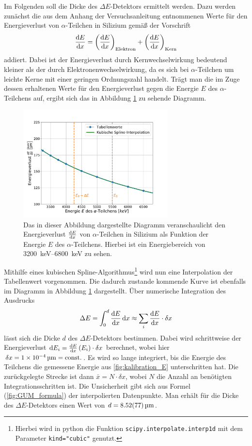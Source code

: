 Im Folgenden soll die Dicke des $\Delta E$-Detektors ermittelt werden.
Dazu werden zunächst die aus dem Anhang der Versuchsanleitung\cite{wwu} entnommenen Werte für den Energieverlust von $\alpha$-Teilchen in Silizium gemäß der Vorschrift
\begin{align}
	\dv{E}{x}= \left( \dv{E}{x}\right)_\text{Elektron} + \left(\dv{E}{x}\right)_\text{Kern}
\end{align}
addiert.
Dabei ist der Energieverlust durch Kernwechselwirkung bedeutend kleiner als der durch Elektronenwechselwirkung, da es sich bei $\alpha$-Teilchen um leichte Kerne mit einer geringen Ordnungszahl handelt.
Trägt man die im Zuge dessen erhaltenen Werte für den Energieverlust gegen die Energie $E$ des $\alpha$-Teilchens auf, ergibt sich das in Abbildung \ref{EnergyLossSpectrum} zu sehende Diagramm.
\begin{figure}[ht]
	\centering
	\includegraphics[width=0.7\textwidth]{src/EnergyLossSpectrum}
	\caption{Das in dieser Abbildung dargestellte Diagramm veranschaulicht den Energieverlust $\dv{E}{x}$ von $\alpha$-Teilchen in Silizium als Funktion der Energie $E$ des $\alpha$-Teilchens. Hierbei ist ein Energiebereich von \SIrange{3200}{6800}{\kilo\electronvolt} zu sehen.}
	\label{EnergyLossSpectrum}
\end{figure}
Mithilfe eines kubischen Spline-Algorithmus\footnote{Hierbei wird in python die Funktion \texttt{scipy.interpolate.interp1d} mit dem Parameter \texttt{kind="cubic"} genutzt.} wird nun eine Interpolation der Tabellenwert vorgenommen.
Die dadurch zustande kommende Kurve ist ebenfalls im Diagramm in Abbildung \ref{EnergyLossSpectrum} dargestellt.
Über numerische Integration des Ausdrucks
\begin{align}
	\label{eq:numInt}
	\Delta E = \int_{0}^{d} \dv{E}{x} (E) \dd{x} \approx \sum_i \dv{E}{x} (E_i) \cdot \delta x
\end{align}
lässt sich die Dicke $d$ des $\Delta E$-Detektors bestimmen.
Dabei wird schrittweise der Energieverlust $\dd E_i = \dv{E}{x} \left(E_i\right) \cdot \delta x$ berechnet, wobei hier $\delta x = \SI{1e-4}{\micro\meter} = \text{const.}$.
Es wird so lange integriert, bis die Energie des Teilchens die gemessene Energie aus \cref{fig:kalibration_E} unterschritten hat.
Die zurückgelegte Strecke ist dann $\bar{x} = N \cdot \delta x$, wobei $N$ die Anzahl an benötigten Integrationsschritten ist.
Die Unsicherheit gibt sich aus Formel (\ref{fig:GUM_formula}) der interpolierten Datenpunkte.
Man erhält für die Dicke des $\Delta E$-Detektors einen Wert von $d=\SI{8.52 +- 0.77}{\micro\meter}$. 


